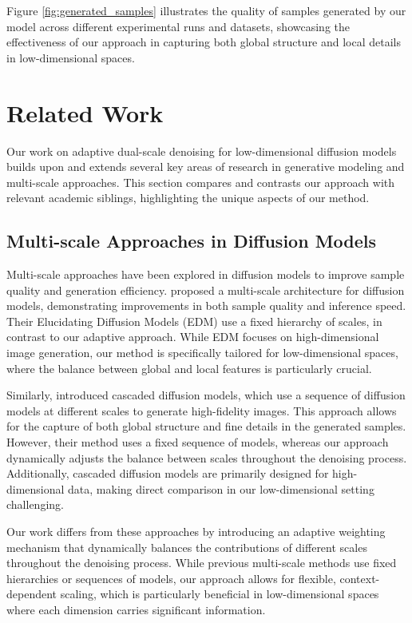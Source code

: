 \documentclass{article} %
\begin{document}
Figure \ref{fig:generated_samples} illustrates the quality of samples generated by our model across different experimental runs and datasets, showcasing the effectiveness of our approach in capturing both global structure and local details in low-dimensional spaces.

\section{Related Work}
\label{sec:related}

Our work on adaptive dual-scale denoising for low-dimensional diffusion models builds upon and extends several key areas of research in generative modeling and multi-scale approaches. This section compares and contrasts our approach with relevant academic siblings, highlighting the unique aspects of our method.

\subsection{Multi-scale Approaches in Diffusion Models}
Multi-scale approaches have been explored in diffusion models to improve sample quality and generation efficiency. \citet{Karras2022ElucidatingTD} proposed a multi-scale architecture for diffusion models, demonstrating improvements in both sample quality and inference speed. Their Elucidating Diffusion Models (EDM) use a fixed hierarchy of scales, in contrast to our adaptive approach. While EDM focuses on high-dimensional image generation, our method is specifically tailored for low-dimensional spaces, where the balance between global and local features is particularly crucial.

Similarly, \citet{Ho2021CascadedDM} introduced cascaded diffusion models, which use a sequence of diffusion models at different scales to generate high-fidelity images. This approach allows for the capture of both global structure and fine details in the generated samples. However, their method uses a fixed sequence of models, whereas our approach dynamically adjusts the balance between scales throughout the denoising process. Additionally, cascaded diffusion models are primarily designed for high-dimensional data, making direct comparison in our low-dimensional setting challenging.

Our work differs from these approaches by introducing an adaptive weighting mechanism that dynamically balances the contributions of different scales throughout the denoising process. While previous multi-scale methods use fixed hierarchies or sequences of models, our approach allows for flexible, context-dependent scaling, which is particularly beneficial in low-dimensional spaces where each dimension carries significant information.
\end{document}
